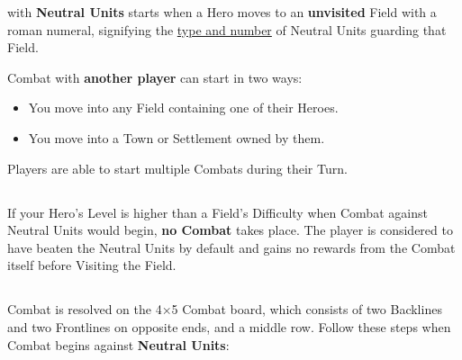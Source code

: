 
\begin{multicols}{2}

 with \textbf{Neutral Units} starts when a Hero moves to an \textbf{unvisited} Field with a roman numeral, signifying the \hyperlink{Difficulty Table}{type and number} of Neutral Units guarding that Field.

Combat with \textbf{another player} can start in two ways:
\begin{itemize}
  \item You move into any Field containing one of their Heroes.
  \item You move into a Town or Settlement owned by them.
\end{itemize}
Players are able to start multiple Combats during their Turn.

\subsection*{}
If your Hero's Level is higher than a Field's Difficulty when Combat against Neutral Units would begin, \textbf{no Combat} takes place.
The player is considered to have beaten the Neutral Units by default and gains no rewards from the Combat itself before Visiting the Field.

\subsection*{}

Combat is resolved on the 4×5 Combat board, which consists of two Backlines and two Frontlines on opposite ends, and a middle row.
Follow these steps when Combat begins against \textbf{Neutral Units}:


\end{multicols}
